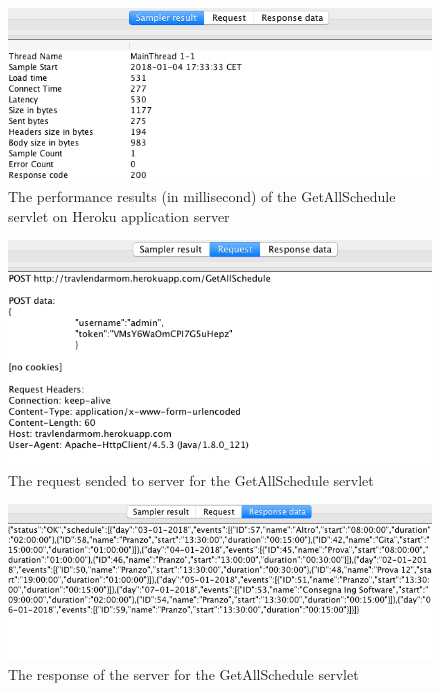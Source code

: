 \documentclass[numbers=noenddot, 12pt, a4paper, oneside]{scrbook}
\begin{document}
\begin{figure}[H]
	\centering
	\includegraphics[width=1.1\textwidth]{Test/GetAllScheduleMain}
	\caption{The performance results (in millisecond) of the GetAllSchedule servlet on Heroku application server}
\end{figure}

\begin{figure}[H]
	\centering
	\includegraphics[width=1.1\textwidth]{Test/GetAllScheduleReq}
	\caption{The request sended to server for the GetAllSchedule servlet}
\end{figure}

\begin{figure}[H]
	\centering
	\includegraphics[width=1.1\textwidth]{Test/GetAllScheduleResp}
	\caption{The response of the server for the GetAllSchedule servlet}
\end{figure}
\end{document}
